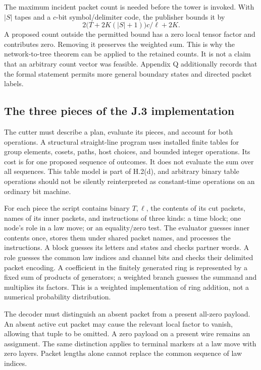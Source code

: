 \documentclass[11pt,letterpaper]{article}
\theoremstyle{definition}\newtheorem{definition}[theorem]{Definition}\newtheorem{example}[theorem]{Example}
\theoremstyle{remark}\newtheorem{remark}[theorem]{Remark}
\begin{document}
The maximum incident packet count is needed before the tower is invoked. With $|S|$ tapes and a $c$-bit symbol/delimiter code, the publisher bounds it by
\[
 2\bigl(T+2K(|S|+1)\bigr)c/\ell+2K.
\]
A proposed count outside the permitted bound has a zero local tensor factor and contributes zero. Removing it preserves the weighted sum. This is why the network-to-tree theorem can be applied to the retained counts. It is not a claim that an arbitrary count vector was feasible. Appendix Q additionally records that the formal statement permits more general boundary states and directed packet labels.

\subsection{The three pieces of the J.3 implementation}
The cutter must describe a plan, evaluate its pieces, and account for both operations. A structural straight-line program uses installed finite tables for group elements, cosets, paths, host choices, and bounded integer operations. Its cost is for one proposed sequence of outcomes. It does not evaluate the sum over all sequences. This table model is part of H.2(d), and arbitrary binary table operations should not be silently reinterpreted as constant-time operations on an ordinary bit machine.

For each piece the script contains binary $T,\ell$, the contents of its cut packets, names of its inner packets, and instructions of three kinds: a time block; one node's role in a law move; or an equality/zero test. The evaluator guesses inner contents once, stores them under shared packet names, and processes the instructions. A block guesses its letters and states and checks partner words. A role guesses the common law indices and channel bits and checks their delimited packet encoding. A coefficient in the finitely generated ring is represented by a fixed sum of products of generators; a weighted branch guesses the summand and multiplies its factors. This is a weighted implementation of ring addition, not a numerical probability distribution.

The decoder must distinguish an absent packet from a present all-zero payload. An absent active cut packet may cause the relevant local factor to vanish, allowing that tuple to be omitted. A zero payload on a present wire remains an assignment. The same distinction applies to terminal markers at a law move with zero layers. Packet lengths alone cannot replace the common sequence of law indices.
\end{document}
